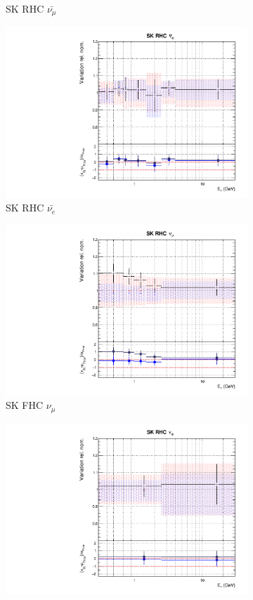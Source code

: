 \begin{figure}[t]
\begin{subfigure}{0.24\textwidth}
  \caption{SK RHC $\bar{\nu_{\mu}}$}
  \label{fig:}
\end{subfigure}
\begin{subfigure}{0.24\textwidth}
  \centering
  \includegraphics[width=0.95\linewidth]{figs/rhcmpdat28flux_13}
  \caption{SK RHC $\bar{\nu_{e}}$}
  \label{fig:}
\end{subfigure}
\begin{subfigure}{0.24\textwidth}
  \centering
  \includegraphics[width=0.95\linewidth]{figs/rhcmpdat28flux_14}
  \caption{SK FHC $\nu_{\mu}$}
  \label{fig:}
\end{subfigure}
\begin{subfigure}{0.24\textwidth}
  \centering
  \includegraphics[width=0.95\linewidth]{figs/rhcmpdat28flux_15}

\end{subfigure}
\end{figure}
